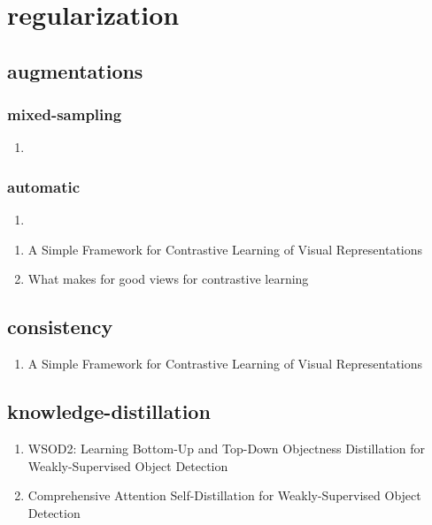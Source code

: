\documentclass[acmlarge]{acmart}
\begin{document}
\section{regularization}
	\subsection{augmentations}
		\subsubsection{mixed-sampling}
		\begin{enumerate}
			\item
		\end{enumerate}
		\subsubsection{automatic}
		\begin{enumerate}
			\item
		\end{enumerate}
	\begin{enumerate}
		\item A Simple Framework for Contrastive Learning of Visual Representations \cite{Chen2020ASF} 

		\item What makes for good views for contrastive learning \cite{Tian2020WhatMF} 

	\end{enumerate}
	\subsection{consistency}
	\begin{enumerate}
		\item A Simple Framework for Contrastive Learning of Visual Representations \cite{Chen2020ASF} 

	\end{enumerate}
	\subsection{knowledge-distillation}
	\begin{enumerate}
		\item WSOD2: Learning Bottom-Up and Top-Down Objectness Distillation for Weakly-Supervised Object Detection \cite{Zeng2019WSOD2LB} 

		\item Comprehensive Attention Self-Distillation for Weakly-Supervised Object Detection \cite{Huang2020ComprehensiveAS} 

	\end{enumerate}
\end{document}
